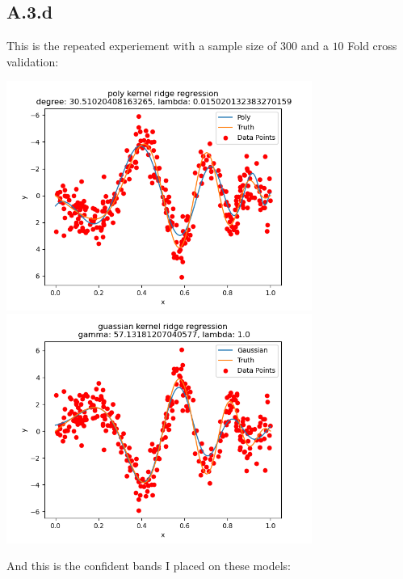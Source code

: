 \documentclass[]{article}
\begin{document}
    \subsection*{A.3.d}
        This is the repeated experiement with a sample size of $300$ and a $10$ Fold cross validation: 
        \begin{center}
            \includegraphics[width=10cm]{hypertune300/A3b-poly.png}
            \includegraphics[width=10cm]{hypertune300/A3b-gauss.png}
        \end{center}
        And this is the confident bands I placed on these models: 
\end{document}
